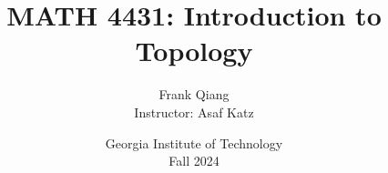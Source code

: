 \documentclass[12pt, letterpaper, oneside]{book}
\title{MATH 4431: Introduction to Topology}
\author{Frank Qiang\\Instructor: Asaf Katz}
\date{Georgia Institute of Technology\\Fall 2024}
\theoremstyle{definition}
\begin{document}
  \maketitle

  \begingroup
  \let\cleardoublepage\clearpage
  \tableofcontents
  \endgroup

  
  
  
  
  
  
  
  
  
  
  
  
  
  
  
  
  
  
  
  
\end{document}
